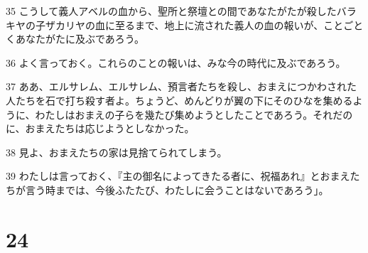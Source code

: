 \par 35 こうして義人アベルの血から、聖所と祭壇との間であなたがたが殺したバラキヤの子ザカリヤの血に至るまで、地上に流された義人の血の報いが、ことごとくあなたがたに及ぶであろう。
\par 36 よく言っておく。これらのことの報いは、みな今の時代に及ぶであろう。
\par 37 ああ、エルサレム、エルサレム、預言者たちを殺し、おまえにつかわされた人たちを石で打ち殺す者よ。ちょうど、めんどりが翼の下にそのひなを集めるように、わたしはおまえの子らを幾たび集めようとしたことであろう。それだのに、おまえたちは応じようとしなかった。
\par 38 見よ、おまえたちの家は見捨てられてしまう。
\par 39 わたしは言っておく、『主の御名によってきたる者に、祝福あれ』とおまえたちが言う時までは、今後ふたたび、わたしに会うことはないであろう」。

\chapter{24}

